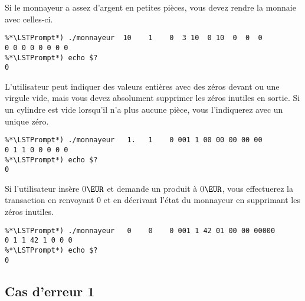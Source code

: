 \bigskip

\noindent Si le monnayeur a assez d'argent en petites pièces, vous devez rendre la monnaie avec celles-ci.

\bigskip

\begin{lstlisting}[frame=single,title={Cas général : insertion de 10€ pour un produit à 1€, en rendant 9€ en petites pièces}]
%*\LSTPrompt*) #            sum  cost 2E 1E 50 20 10  5  2  1
%*\LSTPrompt*) ./monnayeur  10    1    0  3 10  0 10  0  0  0
0 0 0 0 0 0 0 0
%*\LSTPrompt*) echo $?
0
\end{lstlisting}

\bigskip

\noindent L'utilisateur peut indiquer des valeurs entières avec des zéros devant ou une virgule vide, mais vous devez absolument supprimer les zéros inutiles en sortie.
Si un cylindre est vide lorsqu'il n'a plus aucune pièce, vous l'indiquerez avec un unique zéro.

\bigskip

\begin{lstlisting}[frame=single,title={Cas général : écriture des résultats en sortie avec simplification}]
%*\LSTPrompt*) #            sum  cost 2E 1E 50 20 10  5  2  1
%*\LSTPrompt*) ./monnayeur   1.   1    0 001 1 00 00 00 00 00
0 1 1 0 0 0 0 0
%*\LSTPrompt*) echo $?
0
\end{lstlisting}

\bigskip

\noindent Si l'utilisateur insère $ 0 \EUR $ et demande un produit à $ 0 \EUR $, vous effectuerez la transaction en renvoyant $ 0 $ et en décrivant l'état du monnayeur en supprimant les zéros inutiles.

\bigskip

\begin{lstlisting}[frame=single,title={Cas 0}]
%*\LSTPrompt*) #            sum  cost 2E 1E 50 20 10  5  2  1
%*\LSTPrompt*) ./monnayeur   0    0    0 001 1 42 01 00 00 00000
0 1 1 42 1 0 0 0
%*\LSTPrompt*) echo $?
0
\end{lstlisting}



\newpage

\subsection{Cas d'erreur 1}

